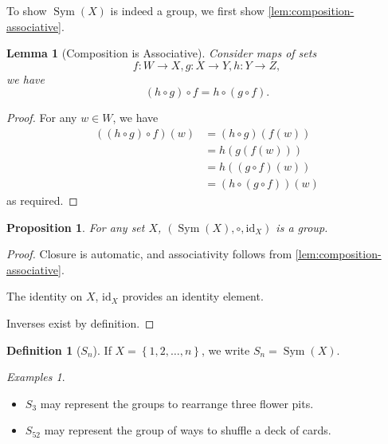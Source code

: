 \documentclass{article}
\newtheorem{lemma}[theorem]{Lemma}
\newtheorem{proposition}[theorem]{Proposition}
\theoremstyle{definition}
\newtheorem{definition}[theorem]{Definition}
\theoremstyle{remark}
\newcommand{\pqty}[1]{\left(#1\right)}
\newcommand{\Bqty}[1]{\left\{#1\right\}}
\newcommand{\functiondomain}[3]{#1:#2\to #3}
\newcommand{\identity}{\mathrm{id}}
\newcommand{\Sym}{\operatorname{Sym}}
\newtheorem*{examples*}{Examples}
\begin{document}
To show \(\Sym\pqty{X}\) is indeed a group, we first show \autoref{lem:composition-associative}.

\begin{lemma}[Composition is Associative]
    \label{lem:composition-associative}%
    Consider maps of sets
    \[
        \functiondomain{f}{W}{X}, \functiondomain{g}{X}{Y}, \functiondomain{h}{Y}{Z},
    \]
    we have
    \[
        \pqty{h \circ g} \circ f = h \circ \pqty{g \circ f}.
    \]
\end{lemma}

\begin{proof}
    For any \(w \in W\), we have
    \begin{align*}
        \pqty{\pqty{h \circ g} \circ f} \pqty{w} &= \pqty{h \circ g} \pqty{f\pqty{w}} \\
        &= h \pqty{g \pqty{f \pqty{w}}} \\
        &= h \pqty{\pqty{g \circ f} \pqty{w}} \\
        &= \pqty{h \circ \pqty{g \circ f}} \pqty{w}
    \end{align*}
    as required.
\end{proof}

\begin{proposition}
    \label{prop:symmetry-group}%
    For any set \(X\), \(\pqty{\Sym\pqty{X}, \circ, \identity_X}\) is a group.
\end{proposition}

\begin{proof}
    Closure is automatic, and associativity follows from \autoref{lem:composition-associative}.

    The identity on \(X\), \(\identity_X\) provides an identity element.

    Inverses exist by definition.
\end{proof}

\begin{definition}[\(S_n\)]
    \label{def:s-n}%
    If \(X = \Bqty{1, 2, \ldots, n}\), we write \(S_n = \Sym\pqty{X}\).
\end{definition}

\begin{examples*}
    \begin{itemize}
        \item \(S_3\) may represent the groups to rearrange three flower pits.
        \item \(S_{52}\) may represent the group of ways to shuffle a deck of cards.
    \end{itemize}
\end{examples*}
\end{document}
